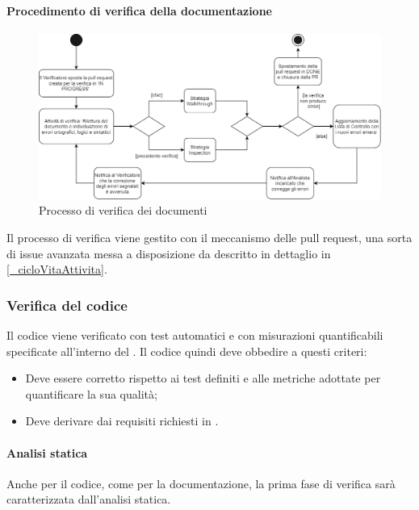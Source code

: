 \paragraph{Procedimento di verifica della documentazione}
\begin{figure}[h!]
    \includegraphics[width=\linewidth]{res/images/processo_verifica.png}
    \caption{Processo di verifica  dei documenti}
\end{figure}
Il processo di verifica viene gestito con il meccanismo delle pull request, una sorta di issue avanzata messa a disposizione da  descritto in dettaglio in \ref{_cicloVitaAttivita}.

\subsubsection{Verifica del codice}
Il codice viene verificato con test automatici e con misurazioni quantificabili specificate all'interno del . Il codice quindi deve obbedire a questi criteri:
\begin{itemize}
    \item Deve essere corretto rispetto ai test definiti e alle metriche adottate per quantificare la sua qualità;
    \item Deve derivare dai requisiti richiesti in .
\end{itemize}

\paragraph{Analisi statica}
Anche per il codice, come per la documentazione, la prima fase di verifica sarà caratterizzata dall'analisi statica. %

